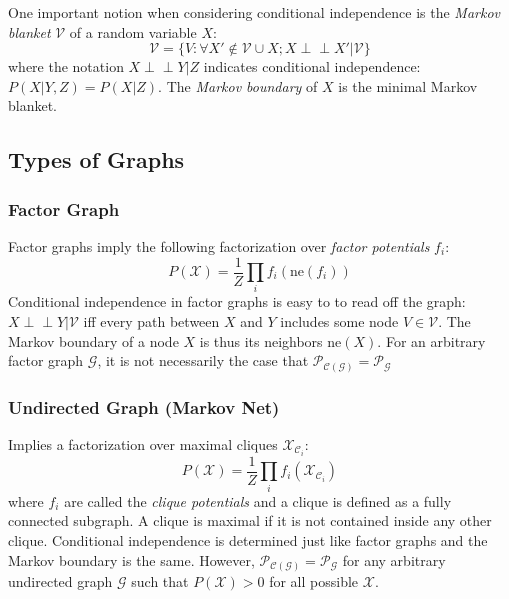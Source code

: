 \documentclass[a4paper]{article}
\begin{document}
One important notion when considering conditional independence is the \emph{Markov blanket} $\mathcal{V}$ of a random variable $X$:
\[ \mathcal{V} = \{V : \forall X'\notin \mathcal{V}\cup X; X \perp\!\!\!\perp X'|\mathcal{V} \} \]
where the notation $X \perp\!\!\!\perp Y|Z$ indicates conditional independence: $P(X|Y,Z) = P(X|Z)$. The \emph{Markov boundary} of $X$ is the minimal Markov blanket.

\subsection{Types of Graphs}

\subsubsection{Factor Graph}
Factor graphs imply the following factorization over \emph{factor potentials} $f_i$:
\[ P(\mathcal{X}) = \frac{1}{Z} \prod_i f_i(\textrm{ne}(f_i)) \]
Conditional independence in factor graphs is easy to to read off the graph: $X \perp\!\!\!\perp Y|\mathcal{V}$ iff every path between $X$ and $Y$ includes some node $V\in \mathcal{V}$. The Markov boundary of a node $X$ is thus its neighbors $\textrm{ne}(X)$. For an arbitrary factor graph $\mathcal{G}$, it is not necessarily the case that $\mathcal{P}_{\mathcal{C}(\mathcal{G})} = \mathcal{P}_\mathcal{G}$

\subsubsection{Undirected Graph (Markov Net)}
Implies a factorization over maximal cliques $\mathcal{X}_{\mathcal{C}_i}$:
\[ P(\mathcal{X}) = \frac{1}{Z} \prod_i f_i(\mathcal{X}_{\mathcal{C}_i}) \]
where $f_i$ are called the \emph{clique potentials} and a clique is defined as a fully connected subgraph. A clique is maximal if it is not contained inside any other clique. Conditional independence is determined just like factor graphs and the Markov boundary is the same. However, $\mathcal{P}_{\mathcal{C}(\mathcal{G})} = \mathcal{P}_\mathcal{G}$ for any arbitrary undirected graph $\mathcal{G}$ such that $P(\mathcal{X})>0$ for all possible $\mathcal{X}$.
\end{document}
